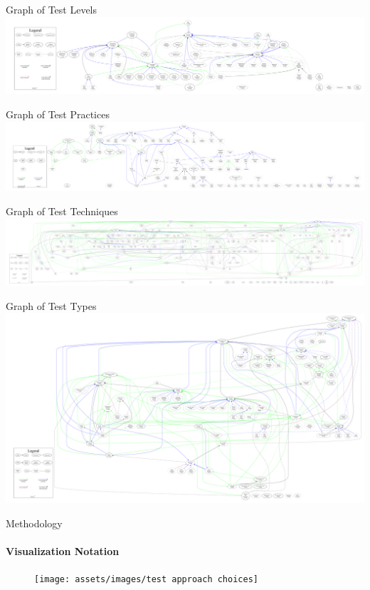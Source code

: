 \documentclass{beamer}
\begin{document}
\begin{frame}{Graph of Test Levels}
    \includegraphics[width=\textwidth]{assets/graphs/levelGraph.pdf}
\end{frame}

\begin{frame}{Graph of Test Practices}
    \includegraphics[width=\textwidth]{assets/graphs/practiceGraph.pdf}
\end{frame}

\begin{frame}{Graph of Test Techniques}
    \includegraphics[width=\textwidth]{assets/graphs/techniqueGraph.pdf}
\end{frame}

\begin{frame}{Graph of Test Types}
    \includegraphics[width=\textwidth]{assets/graphs/typeGraph.pdf}
\end{frame}

\begin{frame}[t]{Methodology}
    \framesubtitle{Visualization Notation}
    \begin{figure}
        \centering
        \texttt{[image: assets/images/test approach choices]}
        \caption{\tiny \citep[Fig.~2]{IEEE2022}}
    \end{figure}
\end{frame}
\end{document}
